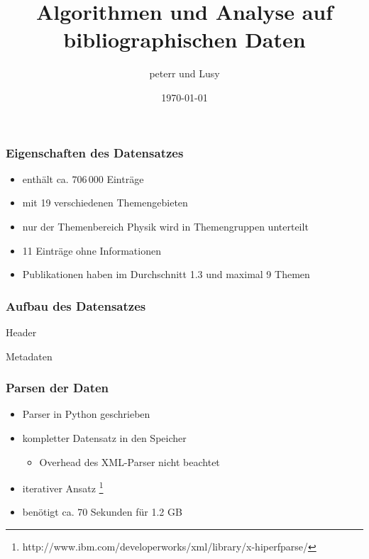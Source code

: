 \documentclass[12pt, xcolor=table]{beamer}
\begin{document}
\title{Algorithmen und Analyse auf bibliographischen Daten}   
\author{peterr und Lusy} 
\date{\today} 

\begin{frame}
	\titlepage
\end{frame}

\begin{frame}
	\frametitle{Eigenschaften des Datensatzes}
	\begin{itemize}
		\item  enthält ca. $706\,000$ Einträge 
		\item  mit 19 verschiedenen Themengebieten 
		\item  nur der Themenbereich Physik wird in Themengruppen unterteilt
		\item  11 Einträge ohne Informationen
		\item  Publikationen haben im Durchschnitt 1.3 und maximal 9 Themen
	\end{itemize} 
\end{frame}
\begin{frame}[fragile]
	\frametitle{Aufbau des Datensatzes}
	\begin{block}{Header}
		
	\end{block}
	\begin{block}{Metadaten}
		
	\end{block}
\end{frame}
\begin{frame}
	\frametitle{Parsen der Daten}
	\begin{itemize}
		\item  Parser in Python geschrieben 
		\item  kompletter Datensatz in den Speicher
			\begin{itemize}
				\item Overhead des XML-Parser nicht beachtet
			\end{itemize}
		\item iterativer Ansatz \footnote{http://www.ibm.com/developerworks/xml/library/x-hiperfparse/}
		\item benötigt ca. 70 Sekunden für 1.2 GB
	\end{itemize}
\end{frame}
\end{document}
